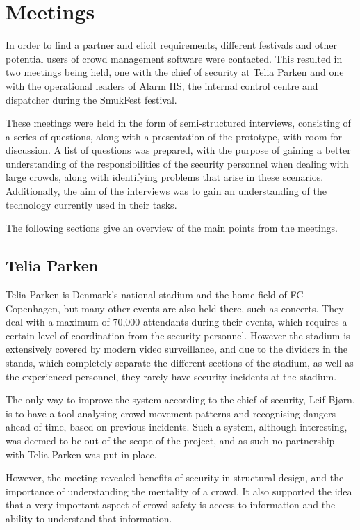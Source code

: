 \section{Meetings} \label{sec:s1_meetings}
In order to find a partner and elicit requirements, different festivals and other potential users of crowd management software were contacted. This resulted in two meetings being held, one with the chief of security at Telia Parken and one with the operational leaders of Alarm HS, the internal control centre and dispatcher during the SmukFest festival. 

These meetings were held in the form of semi-structured interviews, consisting of a series of questions, along with a presentation of the prototype, with room for discussion. A list of questions was prepared, with the purpose of gaining a better understanding of the responsibilities of the security personnel when dealing with large crowds, along with identifying problems that arise in these scenarios. Additionally, the aim of the interviews was to gain an understanding of the technology currently used in their tasks.   

The following sections give an overview of the main points from the meetings.


\subsection{Telia Parken}\label{sub:telia_parken_meeting}
Telia Parken is Denmark's national stadium and the home field of FC Copenhagen, but many other events are also held there, such as concerts. They deal with a maximum of 70,000 attendants during their events, which requires a certain level of coordination from the security personnel. However the stadium is extensively covered by modern video surveillance, and due to the dividers in the stands, which completely separate the different sections of the stadium, as  well as the experienced personnel, they rarely have security incidents at the stadium.

The only way to improve the system according to the chief of security, Leif Bjørn, is to have a tool analysing crowd movement patterns and recognising dangers ahead of time, based on previous incidents. Such a system, although interesting, was deemed to be out of the scope of the project, and as such no partnership with Telia Parken was put in place.

However, the meeting revealed benefits of security in structural design, and the importance of understanding the mentality of a crowd. It also supported the idea that a very important aspect of crowd safety is access to information and the ability to understand that information.

